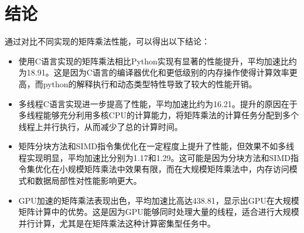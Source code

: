 \documentclass[a4paper,12pt]{ctexart}
\begin{document}
\section{结论}
通过对比不同实现的矩阵乘法性能，可以得出以下结论：
\begin{itemize}
    \item 使用C语言实现的矩阵乘法相比Python实现有显著的性能提升，平均加速比约为18.91。这是因为C语言的编译器优化和更低级别的内存操作使得计算效率更高，而python的解释执行和动态类型特性导致了较大的性能开销。
    \item 多线程C语言实现进一步提高了性能，平均加速比约为16.21。提升的原因在于多线程能够充分利用多核CPU的计算能力，将矩阵乘法的计算任务分配到多个线程上并行执行，从而减少了总的计算时间。
    \item 矩阵分块方法和SIMD指令集优化在一定程度上提升了性能，但效果不如多线程实现明显，平均加速比分别为1.17和1.29。这可能是因为分块方法和SIMD指令集优化在小规模矩阵乘法中效果有限，而在大规模矩阵乘法中，内存访问模式和数据局部性对性能影响更大。
    \item GPU加速的矩阵乘法表现出色，平均加速比高达438.81，显示出GPU在大规模矩阵计算中的优势。这是因为GPU能够同时处理大量的线程，适合进行大规模并行计算，尤其是在矩阵乘法这种计算密集型任务中。
\end{itemize}
\end{document}
